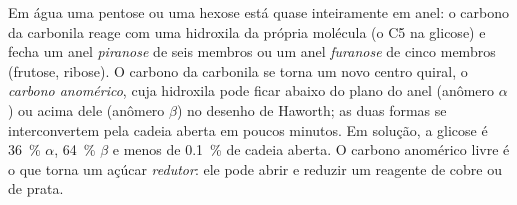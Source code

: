 \begin{proposition}\label{prop:b1:carbohydrates:rings}
Em água uma pentose ou uma hexose está quase inteiramente em anel: o
carbono da carbonila reage com uma hidroxila da própria molécula (o C5
na glicose) e fecha um anel \emph{piranose} de seis membros ou um anel
\emph{furanose} de cinco membros (frutose, ribose). O carbono da
carbonila se torna um novo centro quiral, o \emph{carbono anomérico},
cuja hidroxila pode ficar abaixo do plano do anel (anômero $\alpha$) ou
acima dele (anômero $\beta$) no desenho de Haworth; as duas formas se
interconvertem pela cadeia aberta em poucos minutos. Em solução, a
glicose é \qty{36}{\%} $\alpha$, \qty{64}{\%} $\beta$ e menos de
\qty{0.1}{\%} de cadeia aberta. O carbono anomérico livre é o que torna
um açúcar \emph{redutor}: ele pode abrir e reduzir um reagente de cobre
ou de prata.
\end{proposition}


